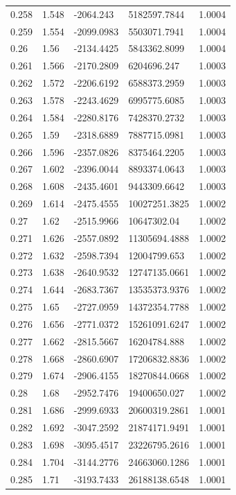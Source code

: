 \begin{tabular}{lllll}
0.258 & 1.548 & -2064.243 & 5182597.7844 & 1.0004 \\
0.259 & 1.554 & -2099.0983 & 5503071.7941 & 1.0004 \\
0.26 & 1.56 & -2134.4425 & 5843362.8099 & 1.0004 \\
0.261 & 1.566 & -2170.2809 & 6204696.247 & 1.0003 \\
0.262 & 1.572 & -2206.6192 & 6588373.2959 & 1.0003 \\
0.263 & 1.578 & -2243.4629 & 6995775.6085 & 1.0003 \\
0.264 & 1.584 & -2280.8176 & 7428370.2732 & 1.0003 \\
0.265 & 1.59 & -2318.6889 & 7887715.0981 & 1.0003 \\
0.266 & 1.596 & -2357.0826 & 8375464.2205 & 1.0003 \\
0.267 & 1.602 & -2396.0044 & 8893374.0643 & 1.0003 \\
0.268 & 1.608 & -2435.4601 & 9443309.6642 & 1.0003 \\
0.269 & 1.614 & -2475.4555 & 10027251.3825 & 1.0002 \\
0.27 & 1.62 & -2515.9966 & 10647302.04 & 1.0002 \\
0.271 & 1.626 & -2557.0892 & 11305694.4888 & 1.0002 \\
0.272 & 1.632 & -2598.7394 & 12004799.653 & 1.0002 \\
0.273 & 1.638 & -2640.9532 & 12747135.0661 & 1.0002 \\
0.274 & 1.644 & -2683.7367 & 13535373.9376 & 1.0002 \\
0.275 & 1.65 & -2727.0959 & 14372354.7788 & 1.0002 \\
0.276 & 1.656 & -2771.0372 & 15261091.6247 & 1.0002 \\
0.277 & 1.662 & -2815.5667 & 16204784.888 & 1.0002 \\
0.278 & 1.668 & -2860.6907 & 17206832.8836 & 1.0002 \\
0.279 & 1.674 & -2906.4155 & 18270844.0668 & 1.0002 \\
0.28 & 1.68 & -2952.7476 & 19400650.027 & 1.0002 \\
0.281 & 1.686 & -2999.6933 & 20600319.2861 & 1.0001 \\
0.282 & 1.692 & -3047.2592 & 21874171.9491 & 1.0001 \\
0.283 & 1.698 & -3095.4517 & 23226795.2616 & 1.0001 \\
0.284 & 1.704 & -3144.2776 & 24663060.1286 & 1.0001 \\
0.285 & 1.71 & -3193.7433 & 26188138.6548 & 1.0001 \\

\end{tabular}
